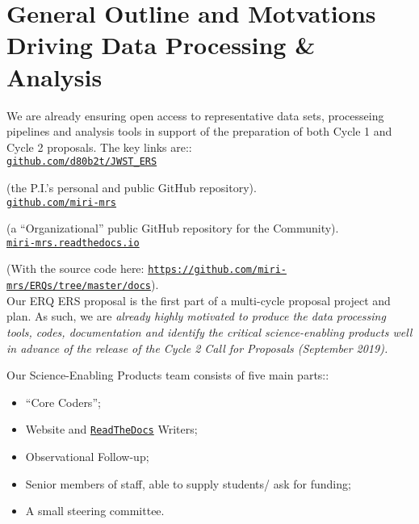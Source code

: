 \section*{General Outline and Motvations Driving Data Processing \& Analysis}
We are already ensuring open access to representative data sets, processeing pipelines and analysis tools in 
support of the preparation of both Cycle 1 and Cycle 2 proposals. 
The key links are:: \\ 

\href{https://github.com/d80b2t/JWST\_ERS}{{\tt github.com/d80b2t/JWST\_ERS}} 

(the P.I.'s personal and public GitHub repository).
\\

\href{https://github.com/miri-mrs}{{\tt github.com/miri-mrs}} 

(a ``Organizational'' public GitHub repository for the Community).
\\

\href{http://miri-mrs.readthedocs.io/en/latest/}{{\tt miri-mrs.readthedocs.io}}

(With the source code here: \href{https://github.com/miri-mrs/ERQs/tree/master/docs}{{\tt https://github.com/miri-mrs/ERQs/tree/master/docs}}). \\


\medskip \medskip
\noindent
Our ERQ ERS proposal is the first part of a multi-cycle proposal
project and plan.  As such, we are {\it already highly motivated to
produce the data processing tools, codes, documentation and identify
the critical science-enabling products well in advance of the release
of the Cycle 2 Call for Proposals (September 2019).}

\smallskip \smallskip
\noindent
Our Science-Enabling Products team consists of five main parts::
\begin{itemize}
    \item ``Core Coders''; 
    \item Website and \href{http://miri-mrs.readthedocs.io/en/latest/}{{\tt ReadTheDocs}} Writers; 
    \item Observational Follow-up; 
    \item Senior members of staff, able to supply students/ ask for funding; 
    \item A small steering committee. 
\end{itemize}


